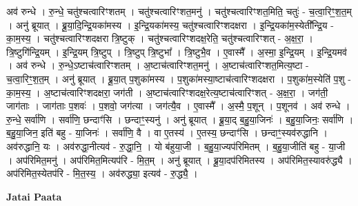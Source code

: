 \documentclass[17pt]{extarticle}
\begin{document}
अव॑ रुन्धे । रु॒न्धे॒ चतु॑श्चत्वारिꣳशतम् । चतु॑श्चत्वारिꣳशत॒मनु॑ । चतु॑श्चत्वारिꣳशत॒मिति॒ चतुः॑ - च॒त्वा॒रिꣳ॒॒श॒त॒म् । अनु॑ ब्रूयात् । ब्रू॒या॒दि॒न्द्रि॒यका॑मस्य । इ॒न्द्रि॒यका॑मस्य॒ चतु॑श्चत्वारिꣳशदक्षरा । इ॒न्द्रि॒यका॑म॒स्येती᳚न्द्रि॒य - का॒म॒स्य॒ । चतु॑श्चत्वारिꣳशदक्षरा त्रि॒ष्टुक् । चतु॑श्चत्वारिꣳशदक्ष॒रेति॒ चतु॑श्चत्वारिꣳशत् - अ॒क्ष॒रा॒ । त्रि॒ष्टुगि॑न्द्रि॒यम् । इ॒न्द्रि॒यम् त्रि॒ष्टुप् । त्रि॒ष्टुप् त्रि॒ष्टुभा᳚ । त्रि॒ष्टुभै॒व । ए॒वास्मै᳚ । अ॒स्मा॒ इ॒न्द्रि॒यम् । इ॒न्द्रि॒यमव॑ । अव॑ रुन्धे । रु॒न्धे॒ऽष्टाच॑त्वारिꣳशतम् । अ॒ष्टाच॑त्वारिꣳशत॒मनु॑ । 
अ॒ष्टाच॑त्वारिꣳशत॒मित्य॒ष्टा - च॒त्वा॒रिꣳ॒॒श॒त॒म् । अनु॑ ब्रूयात् । ब्रू॒या॒त् प॒शुका॑मस्य । प॒शुका॑मस्या॒ष्टाच॑त्वारिꣳशदक्षरा । प॒शुका॑म॒स्येति॑ प॒शु - का॒म॒स्य॒ । अ॒ष्टाच॑त्वारिꣳशदक्षरा॒ जग॑ती । अ॒ष्टाच॑त्वारिꣳशदक्ष॒रेत्य॒ष्टाच॑त्वारिꣳशत् - अ॒क्ष॒रा॒ । जग॑ती॒ जाग॑ताः । जाग॑ताः प॒शवः॑ । प॒शवो॒ जग॑त्या । जग॑त्यै॒व । ए॒वास्मै᳚ । अ॒स्मै॒ प॒शून् । प॒शूनव॑ । अव॑ रुन्धे । रु॒न्धे॒ सर्वा॑णि । सर्वा॑णि॒ छन्दाꣳ॑सि । छन्दाꣳ॒॒स्यनु॑ । अनु॑ ब्रूयात् । ब्रू॒या॒द् ब॒हु॒या॒जिनः॑ । ब॒हु॒या॒जिनः॒ सर्वा॑णि । ब॒हु॒या॒जिन॒ इति॑ बहु - या॒जिनः॑ । सर्वा॑णि॒ वै । वा ए॒तस्य॑ । ए॒तस्य॒ छन्दाꣳ॑सि । छन्दाꣳ॒॒स्यव॑रुद्धानि । अव॑रुद्धानि॒ यः । अव॑रुद्धा॒नीत्यव॑ - रु॒द्धा॒नि॒ । यो ब॑हुया॒जी । ब॒हु॒या॒ज्यप॑रिमितम् । ब॒हु॒या॒जीति॑ बहु - या॒जी । अप॑रिमित॒मनु॑ । अप॑रिमित॒मित्यप॑रि - मि॒त॒म् । अनु॑ ब्रूयात् । ब्रू॒या॒दप॑रिमितस्य । अप॑रिमित॒स्यावरु॑द्ध्यै । अप॑रिमित॒स्येतप॑रि - मि॒त॒स्य॒ । अव॑रुद्ध्या॒ इत्यव॑ - रु॒द्ध्यै॒ । \newline

\textbf{Jatai Paata} \newline
\end{document}
